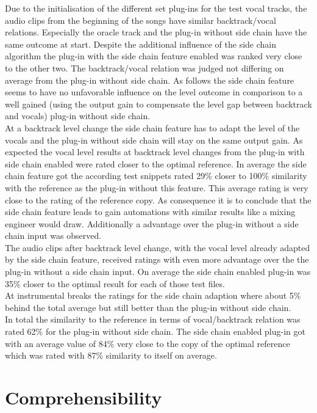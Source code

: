 Due to the initialisation of the different set plug-ins for the test vocal tracks, the audio clips from the beginning of the songs have similar backtrack/vocal relations. Especially the oracle track and the plug-in without side chain have the same outcome at start. Despite the additional influence of the side chain algorithm the plug-in with the side chain feature enabled was ranked very close to the other two. The backtrack/vocal relation was judged not differing on average from the plug-in without side chain. As follows the side chain feature seems to have no unfavorable influence on the level outcome in comparison to a well gained (using the output gain to compensate the level gap between backtrack and vocals) plug-in without side chain.\\
At a backtrack level change the side chain feature has to adapt the level of the vocals and the plug-in without side chain will stay on the same output gain. As expected the vocal level results at backtrack level changes from the plug-in with side chain enabled were rated closer to the optimal reference. In average the side chain feature got the according test snippets rated 29\% closer to 100\% similarity with the reference as the plug-in without this feature. This average rating is very close to the rating of the reference copy. As consequence it is to conclude that the side chain feature leads to gain automations with similar results like a mixing engineer would draw. Additionally a advantage over the plug-in without a side chain input was observed.\\
The audio clips after backtrack level change, with the vocal level already adapted by the side chain feature, received ratings with even more advantage over the the plug-in without a side chain input. On average the side chain enabled plug-in was 35\% closer to the optimal result for each of those test files.\\
At instrumental breaks the ratings for the side chain adaption where about 5\% behind the total average but still better than the plug-in without side chain.\\
In total the similarity to the reference in terms of vocal/backtrack relation was rated 62\% for the plug-in without side chain. The side chain enabled plug-in got with an average value of 84\% very close to the copy of the optimal reference which was rated with 87\% similarity to itself on average.\\

\section{Comprehensibility}


